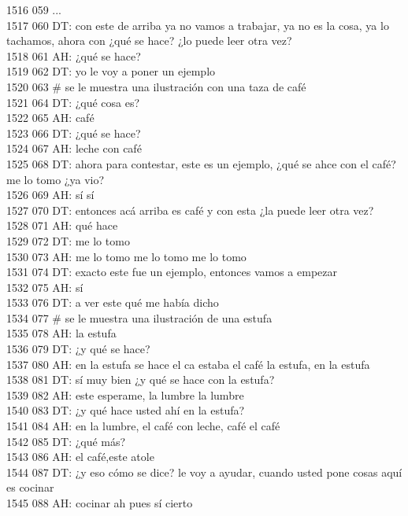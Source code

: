 1516 059 ...\\
1517 060 DT: con este de arriba ya no vamos a trabajar, ya no es la cosa, ya lo tachamos, ahora con ¿qué se hace? ¿lo puede leer otra vez?\\
1518 061 AH: ¿qué se hace?\\
1519 062 DT: yo le voy a poner un ejemplo\\
1520 063 # se le muestra una ilustración con una taza de café\\
1521 064 DT: ¿qué cosa es?\\
1522 065 AH: café\\
1523 066 DT: ¿qué se hace?\\
1524 067 AH: leche con café\\
1525 068 DT: ahora para contestar, este es un ejemplo, ¿qué se ahce con el café? me lo tomo ¿ya vio?\\
1526 069 AH: sí sí\\
1527 070 DT: entonces acá arriba es café y con esta ¿la puede leer otra vez?\\
1528 071 AH: qué hace\\
1529 072 DT: me lo tomo\\
1530 073 AH: me lo tomo me lo tomo me lo tomo\\
1531 074 DT: exacto este fue un ejemplo, entonces vamos a empezar\\
1532 075 AH: sí\\
1533 076 DT: a ver este qué me había dicho\\
1534 077 # se le muestra una ilustración de una estufa\\
1535 078 AH: la estufa\\
1536 079 DT: ¿y qué se hace?\\
1537 080 AH: en la estufa se hace el ca estaba el café la estufa, en la estufa\\
1538 081 DT: sí muy bien ¿y qué se hace con la estufa?\\
1539 082 AH: este esperame, la lumbre la lumbre\\
1540 083 DT: ¿y qué hace usted ahí en la estufa?\\
1541 084 AH: en la lumbre, el café con leche, café el café\\
1542 085 DT: ¿qué más?\\
1543 086 AH: el café,este atole\\
1544 087 DT: ¿y eso cómo se dice? le voy a ayudar, cuando usted pone cosas aquí es cocinar\\
1545 088 AH: cocinar ah pues sí cierto\\

